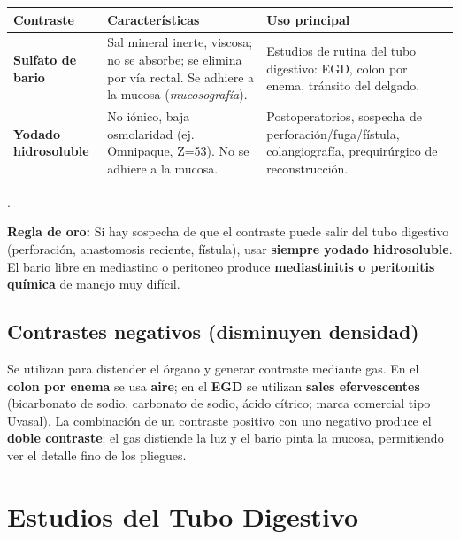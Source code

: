 {\renewcommand{\arraystretch}{1.35}
	\begin{center}
		\begin{tabular}{>{\bfseries}p{3.5cm} p{5.5cm} p{4.5cm}}
			\hline
			Contraste & Características & Uso principal \\
			\hline
			Sulfato de bario & Sal mineral inerte, viscosa; no se absorbe; se elimina por vía rectal. Se adhiere a la mucosa (\textit{mucosografía}). & Estudios de rutina del tubo digestivo: EGD, colon por enema, tránsito del delgado. \\[0.5em]
			\hline
			Yodado hidrosoluble & No iónico, baja osmolaridad (ej. Omnipaque, Z=53). No se adhiere a la mucosa. & Postoperatorios, sospecha de perforación/fuga/fístula, colangiografía, prequirúrgico de reconstrucción. \\
			\hline
		\end{tabular}
	\end{center}
}
.\\
\begin{cajakeypoints}
	\textbf{Regla de oro:} Si hay sospecha de que el contraste puede salir del tubo digestivo (perforación, anastomosis reciente, fístula), usar \textbf{siempre yodado hidrosoluble}. El bario libre en mediastino o peritoneo produce \textbf{mediastinitis o peritonitis química} de manejo muy difícil.
\end{cajakeypoints}

\subsection*{Contrastes negativos (disminuyen densidad)}

Se utilizan para distender el órgano y generar contraste mediante gas. En el \textbf{colon por enema} se usa \textbf{aire}; en el \textbf{EGD} se utilizan \textbf{sales efervescentes} (bicarbonato de sodio, carbonato de sodio, ácido cítrico; marca comercial tipo Uvasal). La combinación de un contraste positivo con uno negativo produce el \textbf{doble contraste}: el gas distiende la luz y el bario pinta la mucosa, permitiendo ver el detalle fino de los pliegues.

\section*{Estudios del Tubo Digestivo}

